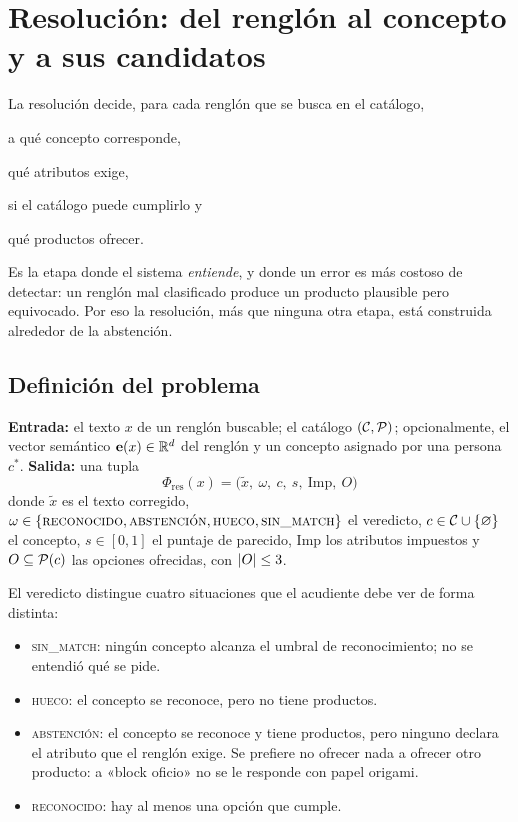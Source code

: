 \section{Resolución: del renglón al concepto y a sus candidatos}
\label{sec:resolucion}

La resolución decide, para cada renglón que se busca en el catálogo,
\begin{enumerate*}[label=(\alph*)]
  \item a qué concepto corresponde,
  \item qué atributos exige,
  \item si el catálogo puede cumplirlo y
  \item qué productos ofrecer.
\end{enumerate*}
Es la etapa donde el sistema \emph{entiende}, y donde un error es más costoso
de detectar: un renglón mal clasificado produce un producto plausible pero
equivocado. Por eso la resolución, más que ninguna otra etapa, está construida
alrededor de la abstención.

\subsection{Definición del problema}

\begin{definicion}
\label{def:resolucion}
\textbf{Entrada:} el texto $x$ de un renglón buscable; el catálogo
$(\mathcal{C},\mathcal{P})$; opcionalmente, el vector semántico $\mathbf{e}(x)\in\mathbb{R}^{d}$
del renglón y un concepto asignado por una persona $c^\ast$.
\textbf{Salida:} una tupla
\[
  \Phi_{\mathrm{res}}(x) = \bigl(\tilde x,\ \omega,\ c,\ s,\ \mathrm{Imp},\ O\bigr)
\]
donde $\tilde x$ es el texto corregido, $\omega\in\{\textsc{reconocido},
\textsc{abstención}, \textsc{hueco}, \textsc{sin\_match}\}$ el veredicto,
$c\in\mathcal{C}\cup\{\varnothing\}$ el concepto, $s\in[0,1]$ el puntaje de parecido,
$\mathrm{Imp}$ los atributos impuestos y $O\subseteq\mathcal{P}(c)$ las opciones
ofrecidas, con $\left\lvert O \right\rvert\leq 3$.
\end{definicion}

El veredicto distingue cuatro situaciones que el acudiente debe ver de forma
distinta:
\begin{itemize}
  \item \textsc{sin\_match}: ningún concepto alcanza el umbral de
        reconocimiento; no se entendió qué se pide.
  \item \textsc{hueco}: el concepto se reconoce, pero no tiene productos.
  \item \textsc{abstención}: el concepto se reconoce y tiene productos, pero
        ninguno declara el atributo que el renglón exige. Se prefiere no
        ofrecer nada a ofrecer otro producto: a «block oficio» no se le
        responde con papel origami.
  \item \textsc{reconocido}: hay al menos una opción que cumple.
\end{itemize}

